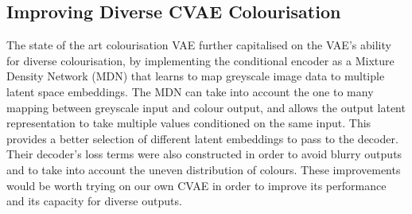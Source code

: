 \documentclass{l4proj}
\begin{document}
\subsection{Improving Diverse CVAE Colourisation}

The state of the art colourisation VAE \cite{DiverseColorization} further capitalised on the VAE's ability for diverse colourisation, by implementing the conditional encoder as a Mixture Density Network (MDN) that learns to map greyscale image data to multiple latent space embeddings. The MDN can take into account the one to many mapping between greyscale input and colour output, and allows the output latent representation to take multiple values conditioned on the same input. This provides a better selection of different latent embeddings to pass to the decoder. Their decoder's loss terms were also constructed in order to avoid blurry outputs and to take into account the uneven distribution of colours. These improvements would be worth trying on our own CVAE in order to improve its performance and its capacity for diverse outputs.

%
% 
\end{document}
